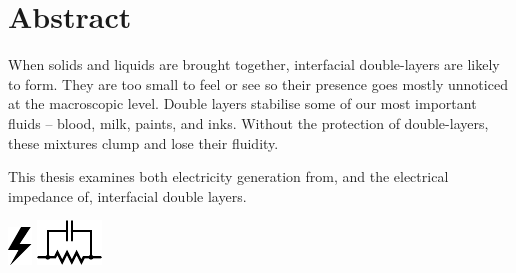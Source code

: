 





\rmfamily







\chapter*{Abstract}
  When solids and liquids are brought together, interfacial double-layers are likely to form.
  They are too small to feel or see so their presence goes mostly unnoticed at the macroscopic level.
  Double layers stabilise some of our most important fluids -- blood, milk, paints, and inks.
  Without the protection of double-layers, these mixtures clump and lose their fluidity.

  \vspace{-0.3cm}
  \begin{center}
    \parbox{8.8cm}{
      \begin{center}
        This thesis examines both electricity generation from, and the electrical impedance of, interfacial double layers.
      \end{center}
      \vspace{-1.35cm}
    }
    \vspace{-0.3cm}
    \parbox{15cm}{
        \hspace{0.8cm}
        \hbox{\vspace{-0.9cm}\includegraphics{graphics/logo_electricity}}
        \hbox{\hspace{9.8cm}\includegraphics{graphics/logo_impedance}}
    }
  \end{center}
  \vspace{0.5cm}



